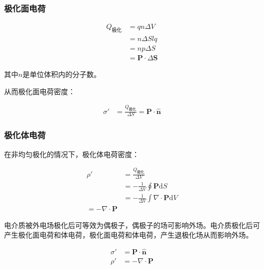 \documentclass[12pt,onecolumn,a4paper]{book}
\numberwithin{table}{subsection}
\numberwithin{equation}{subsection}
\begin{document}
\subsubsection{极化面电荷}

\begin{align}
    Q_\text{极化} & = q n \Delta V                       \\
                & = n \Delta S l q                     \\
                & = n p \Delta S                       \\
                & = \mathbf{P} \cdot \Delta \mathbf{S}
\end{align}

其中$n$是单位体积内的分子数。

从而极化面电荷密度：

\begin{align}
    \sigma' & = \frac{Q_\text{极化}}{\Delta S} = \mathbf{P} \cdot \hat{\mathbf{n}}
\end{align}

\subsubsection{极化体电荷}

在非均匀极化的情况下，极化体电荷密度：

\begin{align}
    \rho' & = \frac{Q_\text{极化}}{ \Delta V}                                 \\
          & = -\frac{1}{\Delta V} \oint  \mathbf{P} \mathrm{d} S            \\
          & = -\frac{1}{\Delta V} \int \nabla \cdot \mathbf{P} \mathrm{d} V \\
    = -\nabla \cdot \mathbf{P}
\end{align}

电介质被外电场极化后可等效为偶极子，偶极子的场可影响外场。电介质极化后可产生极化面电荷和体电荷，极化面电荷和体电荷，产生退极化场从而影响外场。

\begin{align}
    \sigma' & = \mathbf{P} \cdot \hat{\mathbf{n}} \\
    \rho'   & = -\nabla \cdot \mathbf{P}
\end{align}
\end{document}
